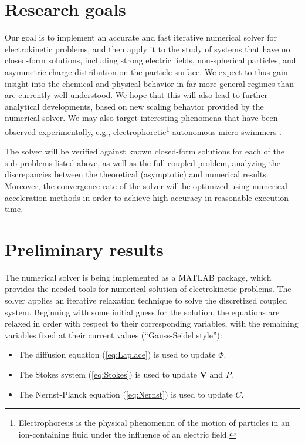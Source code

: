 \documentclass[12pt]{article}
\providecommand\bV{\boldsymbol{V}}
\begin{document}
\section{Research goals}
Our goal is to implement an accurate and fast iterative numerical
solver for electrokinetic problems, and then apply it to the study
of systems that have no closed-form solutions, including strong
electric fields, non-spherical particles, and asymmetric charge
distribution on the particle surface. We expect to thus gain insight
into the chemical and physical behavior in far more general regimes
than are currently well-understood. We hope that this will also lead
to further analytical developments, based on new scaling behavior
provided by the numerical solver. We may also target interesting
phenomena that have been observed experimentally, e.g.,
electrophoretic\footnote{Electrophoresis is the physical
phenomenon of the motion of particles in an ion-containing fluid
under the influence of an electric field.} autonomous
micro-swimmers \cite{paxton2004catalytic, howse2007self}.

The solver will be verified against known closed-form solutions
for each of the sub-problems listed above, as well as the full
coupled problem, analyzing the discrepancies between the
theoretical (asymptotic) and numerical results. Moreover, the
convergence rate of the solver will be optimized using numerical
acceleration methods in order to achieve high accuracy in
reasonable execution time.


\section{Preliminary results}
The numerical solver is being implemented as a MATLAB package,
which provides the needed tools for numerical solution of
electrokinetic problems. The solver applies an iterative
relaxation technique to solve the discretized coupled system.
Beginning with some initial guess for the solution, the equations
are relaxed in order with respect to their corresponding
variables, with the remaining variables fixed at their current
values (``Gauss-Seidel style''):
\begin{itemize}
  \item The diffusion equation (\ref{eq:Laplace}) is used to update $\varPhi$.
  \item The Stokes system (\ref{eq:Stokes}) is used to update $\bV$ and $P$.
  \item The Nernst-Planck equation (\ref{eq:Nernst}) is used to update $C$.
\end{itemize}
\end{document}
